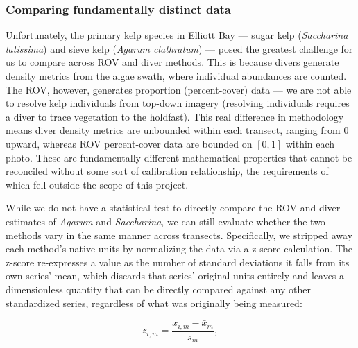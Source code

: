 \documentclass[11pt]{article}
\begin{document}
\subsubsection{Comparing fundamentally distinct data}
\label{subsubsec:distinct_taxa}

Unfortunately, the primary kelp species in Elliott Bay --- sugar kelp 
(\textit{Saccharina latissima}) and sieve kelp (\textit{Agarum clathratum}) --- 
posed the greatest challenge for us to compare across ROV and diver methods. 
This is because divers generate density metrics from the algae swath, where 
individual abundances are counted. 
The ROV, however, generates proportion (percent-cover) data --- we are not able 
to resolve kelp individuals from top-down imagery (resolving individuals 
requires a diver to trace vegetation to the holdfast). 
This real difference in methodology means diver density metrics are unbounded 
within each transect, ranging from 0 upward, whereas ROV percent-cover data are 
bounded on $[0,1]$ within each photo. 
These are fundamentally different mathematical properties that cannot be 
reconciled without some sort of calibration relationship, the requirements of 
which fell outside the scope of this project. 

While we do not have a statistical test to directly compare the ROV and diver 
estimates of \textit{Agarum} and \textit{Saccharina}, we can still evaluate 
whether the two methods vary in the same manner across transects. 
Specifically, we stripped away each method's native units by normalizing the 
data via a z-score calculation. 
The z-score re-expresses a value as the number of standard deviations it falls 
from its own series' mean, which discards that series' original units entirely 
and leaves a dimensionless quantity that can be directly compared against any 
other standardized series, regardless of what was originally being measured:

\begin{equation}
z_{i,m} = \frac{x_{i,m} - \bar{x}_m}{s_m},
\label{eq:z-score}
\end{equation}
\end{document}
